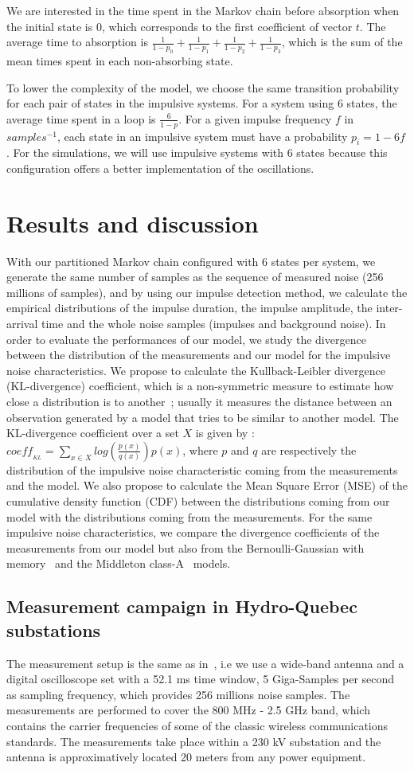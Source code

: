 \documentclass[journal]{IEEEtran}
\begin{document}
We are interested in the time spent in the Markov chain before absorption when the initial state is $0$, which corresponds to the first coefficient of vector $t$. The average time to absorption is $\frac{1}{1-p_0}+\frac{1}{1-p_1}+\frac{1}{1-p_2}+\frac{1}{1-p_3}$, which is the sum of the mean times spent in each non-absorbing state.\

To lower the complexity of the model, we choose the same transition probability for each pair of states in the impulsive systems. For a system using 6 states, the average time spent in a loop is $\frac{6}{1-p}$. For a given impulse frequency $f$ in $samples^{-1}$, each state in an impulsive system must have a probability $p_{i}=1-6f$. For the simulations, we will use impulsive systems with 6 states because this configuration offers a better implementation of the oscillations.
\section{Results and discussion}
With our partitioned Markov chain configured with 6 states per system, we generate the same number of samples as the sequence of measured noise (256 millions of samples), and by using our impulse detection method, we calculate the empirical distributions of the impulse duration, the impulse amplitude, the inter-arrival time and the whole noise samples (impulses and background noise). In order to evaluate the performances of our model, we study the divergence between the distribution of the measurements and our model for the impulsive noise characteristics. We propose to calculate the Kullback-Leibler divergence (KL-divergence) coefficient, which is a non-symmetric measure to estimate how close a distribution is to another~\cite{KL}; usually it measures the distance between an observation generated by a model that tries to be similar to another model. The KL-divergence coefficient over a set $X$ is given by : $coeff_{_{KL}} = \sum\limits_{x\in X}log(\frac{p(x)}{q(x)})p(x)$, where $p$ and $q$ are respectively the distribution of the impulsive noise characteristic coming from the measurements and the model. We also propose to calculate the Mean Square Error (MSE) of the cumulative density function (CDF) between the distributions coming from our model with the distributions coming from the measurements. For the same impulsive noise characteristics, we compare the divergence coefficients of the measurements from our model but also from the Bernoulli-Gaussian with memory~\cite{PLC} and the Middleton class-A~\cite{midd1} models.
\subsection{Measurement campaign in Hydro-Quebec substations}
The measurement setup is the same as in~\cite{taiwan,cigre}, i.e we use a wide-band antenna and a digital oscilloscope set with a 52.1 ms time window, 5 Giga-Samples per second as sampling frequency, which provides 256 millions noise samples. The measurements are performed to cover the 800 MHz - 2.5 GHz band, which contains the carrier frequencies of some of the classic wireless communications standards. The measurements take place within a 230 kV substation and the antenna is approximatively located 20 meters from any power equipment.
\end{document}
